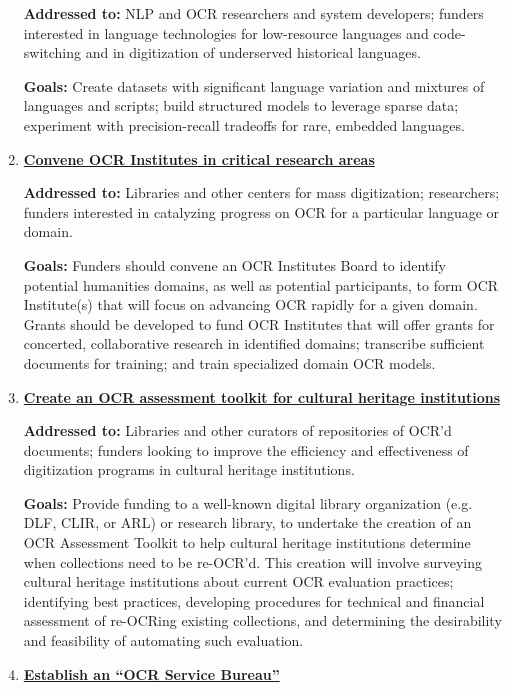 \documentclass[twoside,11pt]{report}
\begin{document}
\begin{enumerate}
\textbf{Addressed to:} NLP and OCR researchers and system developers; funders interested in language technologies for low-resource languages and code-switching and in digitization of underserved historical languages.

\textbf{Goals:} Create datasets with significant language variation and mixtures of languages and scripts; build structured models to leverage sparse data; experiment with precision-recall tradeoffs for rare, embedded languages.

\item \hyperref[sec:rec-institutes]{\textbf{Convene OCR Institutes in critical research areas}}

\textbf{Addressed to:} Libraries and other centers for mass digitization; researchers; funders interested in catalyzing progress on OCR for a particular language or domain.

\textbf{Goals:} Funders should convene an OCR Institutes Board to identify potential humanities domains, as well as potential participants, to form OCR Institute(s) that will focus on advancing OCR rapidly for a given domain. Grants should be developed to fund OCR Institutes that will offer grants for concerted, collaborative research in identified domains; transcribe sufficient documents for training; and train specialized domain OCR models.

\item \hyperref[sec:rec-assessment]{\textbf{Create an OCR assessment toolkit for cultural heritage institutions}}

\textbf{Addressed to:} Libraries and other curators of repositories of OCR'd documents; funders looking to improve the efficiency and effectiveness of digitization programs in cultural heritage institutions.

\textbf{Goals:} Provide funding to a well-known digital library organization (e.g. DLF, CLIR, or ARL) or research library, to undertake the creation of an OCR Assessment Toolkit to help cultural heritage institutions determine when collections need to be re-OCR'd. This creation will involve surveying cultural heritage institutions about current OCR evaluation practices; identifying best practices, developing procedures for technical and financial assessment of re-OCRing existing collections, and determining the desirability and feasibility of automating such evaluation.

\item \hyperref[sec:rec-bureau]{\textbf{Establish an ``OCR Service Bureau''}}


\end{enumerate}
\end{document}
